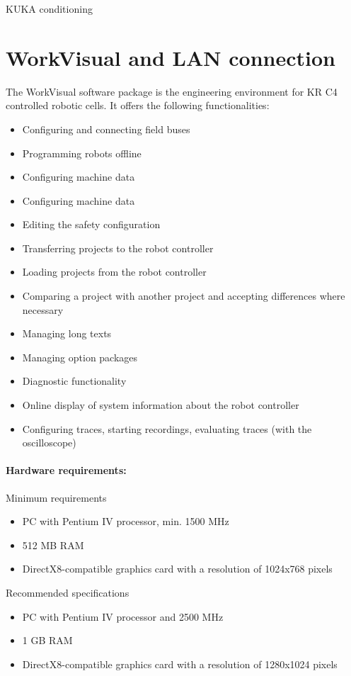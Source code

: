 \documentclass{book}
\begin{document}
\begin{chapter}{KUKA conditioning}
		\section{WorkVisual and LAN connection}
		The WorkVisual software package is the engineering environment for KR C4 controlled robotic cells. It offers the following functionalities:
		\begin{itemize}
			\item Configuring and connecting field buses
			\item Programming robots offline
			\item Configuring machine data
			\item Configuring machine data
			\item Editing the safety configuration
			\item Transferring projects to the robot controller
			\item Loading projects from the robot controller
			\item Comparing a project with another project and accepting differences where necessary
			\item Managing long texts
			\item Managing option packages
			\item Diagnostic functionality
			\item Online display of system information about the robot controller
			\item Configuring traces, starting recordings, evaluating traces (with the oscilloscope)
		\end{itemize}
		
			\paragraph{Hardware requirements:}
			Minimum requirements 
				\begin{itemize}
					\item PC with Pentium IV processor, min. 1500 MHz
					\item 512 MB RAM
					\item DirectX8-compatible graphics card with a resolution of 1024x768 pixels
				\end{itemize}
			Recommended specifications
				\begin{itemize}
					\item PC with Pentium IV processor and 2500 MHz
					\item 1 GB RAM
					\item DirectX8-compatible graphics card with a resolution of 1280x1024 pixels
				\end{itemize}

\end{chapter}
\end{document}
